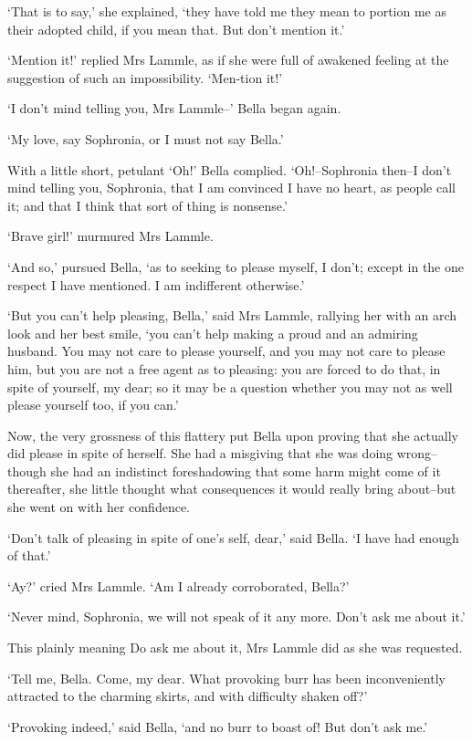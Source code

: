 ‘That is to say,’ she explained, ‘they have told me they mean to portion
me as their adopted child, if you mean that. But don’t mention it.’

‘Mention it!’ replied Mrs Lammle, as if she were full of awakened
feeling at the suggestion of such an impossibility. ‘Men-tion it!’

‘I don’t mind telling you, Mrs Lammle--’ Bella began again.

‘My love, say Sophronia, or I must not say Bella.’

With a little short, petulant ‘Oh!’ Bella complied. ‘Oh!--Sophronia
then--I don’t mind telling you, Sophronia, that I am convinced I have
no heart, as people call it; and that I think that sort of thing is
nonsense.’

‘Brave girl!’ murmured Mrs Lammle.

‘And so,’ pursued Bella, ‘as to seeking to please myself, I don’t;
except in the one respect I have mentioned. I am indifferent otherwise.’

‘But you can’t help pleasing, Bella,’ said Mrs Lammle, rallying her with
an arch look and her best smile, ‘you can’t help making a proud and an
admiring husband. You may not care to please yourself, and you may not
care to please him, but you are not a free agent as to pleasing: you
are forced to do that, in spite of yourself, my dear; so it may be a
question whether you may not as well please yourself too, if you can.’

Now, the very grossness of this flattery put Bella upon proving that she
actually did please in spite of herself. She had a misgiving that she
was doing wrong--though she had an indistinct foreshadowing that some
harm might come of it thereafter, she little thought what consequences
it would really bring about--but she went on with her confidence.

‘Don’t talk of pleasing in spite of one’s self, dear,’ said Bella. ‘I
have had enough of that.’

‘Ay?’ cried Mrs Lammle. ‘Am I already corroborated, Bella?’

‘Never mind, Sophronia, we will not speak of it any more. Don’t ask me
about it.’

This plainly meaning Do ask me about it, Mrs Lammle did as she was
requested.

‘Tell me, Bella. Come, my dear. What provoking burr has been
inconveniently attracted to the charming skirts, and with difficulty
shaken off?’

‘Provoking indeed,’ said Bella, ‘and no burr to boast of! But don’t ask
me.’


